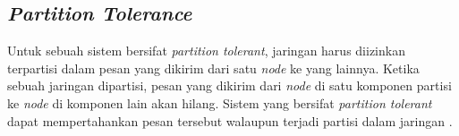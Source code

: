 \subsection{\textit{Partition Tolerance}}

Untuk sebuah sistem bersifat \textit{partition tolerant}, jaringan harus diizinkan terpartisi dalam pesan yang dikirim dari satu \textit{node} ke yang lainnya. Ketika sebuah jaringan dipartisi, pesan yang dikirim dari \textit{node} di satu komponen partisi ke \textit{node} di komponen lain akan hilang. Sistem yang bersifat \textit{partition tolerant} dapat mempertahankan pesan tersebut walaupun terjadi partisi dalam jaringan \parencite{gilbert2002brewer}.